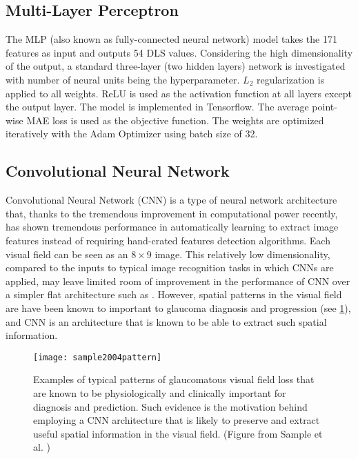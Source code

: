 \subsection{Multi-Layer Perceptron}

The \ac{MLP} (also known as fully-connected neural network) model takes the 171 features as input and outputs 54 \ac{DLS} values. Considering the high dimensionality of the output, a standard three-layer (two hidden layers) network is investigated with number of neural units being the hyperparameter. $L_2$ regularization is applied to all weights. ReLU is used as the activation function at all layers except the output layer. The model is implemented in Tensorflow. \cite{tensorflow} The average point-wise \ac{MAE} loss is used as the objective function. The weights are optimized iteratively with the Adam Optimizer using batch size of 32.

\subsection{Convolutional Neural Network}

Convolutional Neural Network (CNN) is a type of neural network architecture that, thanks to the tremendous improvement in computational power recently, has shown tremendous performance in automatically learning to extract image features instead of requiring hand-crated features detection algorithms. Each visual field can be seen as an $8\times9$ image. This relatively low dimensionality, compared to the inputs to typical image recognition tasks in which \acp{CNN} are applied, may leave limited room of improvement in the performance of \ac{CNN} over a simpler flat architecture such as . However, spatial patterns in the visual field are have been known to important to glaucoma diagnosis and progression (see \cref{fig:fieldpattern}), and \ac{CNN} is an architecture that is known to be able to extract such spatial information. 

\begin{figure}[p]
	\centering
	\texttt{[image: sample2004pattern]}
	\caption[Examples of typical patterns of glaucomatous visual field loss]{Examples of typical patterns of glaucomatous visual field loss that are known to be physiologically and clinically important for diagnosis and prediction. Such evidence is the motivation behind employing a \ac{CNN} architecture that is likely to preserve and extract useful spatial information in the visual field. (Figure from Sample et al. \cite{Sample2004})}
	\label{fig:fieldpattern}
\end{figure}

